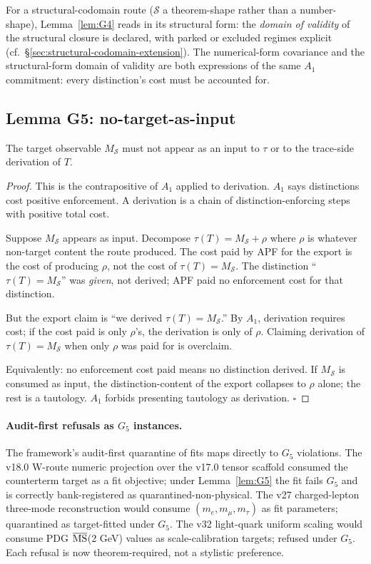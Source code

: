For a structural-codomain route ($\mathcal{S}$ a theorem-shape rather than a number-shape), Lemma~\ref{lem:G4} reads in its structural form: the \emph{domain of validity} of the structural closure is declared, with parked or excluded regimes explicit (cf.\ \S\ref{sec:structural-codomain-extension}). The numerical-form covariance and the structural-form domain of validity are both expressions of the same $A_1$ commitment: every distinction's cost must be accounted for.

\subsection{Lemma G5: no-target-as-input}
\label{subsec:lemma-G5}

\begin{lemma}[No-Smuggling]
\label{lem:G5}
The target observable $M_{\mathcal{S}}$ must not appear as an input to $\tau$ or to the trace-side derivation of $T$.
\end{lemma}

\begin{proof}
This is the contrapositive of $A_1$ applied to derivation. $A_1$ says distinctions cost positive enforcement. A derivation is a chain of distinction-enforcing steps with positive total cost.

Suppose $M_{\mathcal{S}}$ appears as input. Decompose $\tau(T) = M_{\mathcal{S}} + \rho$ where $\rho$ is whatever non-target content the route produced. The cost paid by APF for the export is the cost of producing $\rho$, not the cost of $\tau(T) = M_{\mathcal{S}}$. The distinction ``$\tau(T) = M_{\mathcal{S}}$'' was \emph{given}, not derived; APF paid no enforcement cost for that distinction.

But the export claim is ``we derived $\tau(T) = M_{\mathcal{S}}$.'' By $A_1$, derivation requires cost; if the cost paid is only $\rho$'s, the derivation is only of $\rho$. Claiming derivation of $\tau(T) = M_{\mathcal{S}}$ when only $\rho$ was paid for is overclaim.

Equivalently: no enforcement cost paid means no distinction derived. If $M_{\mathcal{S}}$ is consumed as input, the distinction-content of the export collapses to $\rho$ alone; the rest is a tautology. $A_1$ forbids presenting tautology as derivation. $\square$
\end{proof}

\paragraph{Audit-first refusals as $G_5$ instances.} The framework's audit-first quarantine of fits maps directly to $G_5$ violations. The v18.0 W-route numeric projection over the v17.0 tensor scaffold consumed the counterterm target as a fit objective; under Lemma~\ref{lem:G5} the fit fails $G_5$ and is correctly bank-registered as quarantined-non-physical. The v27 charged-lepton three-mode reconstruction would consume $(m_e, m_\mu, m_\tau)$ as fit parameters; quarantined as target-fitted under $G_5$. The v32 light-quark uniform scaling would consume PDG $\overline{\rm MS}$(2 GeV) values as scale-calibration targets; refused under $G_5$. Each refusal is now theorem-required, not a stylistic preference.

